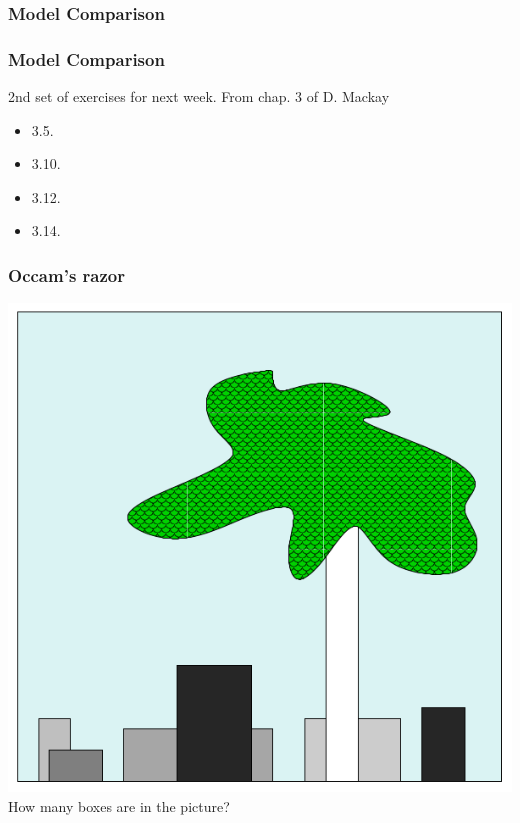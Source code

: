 \documentclass{beamer}
\begin{document}
\begin{frame}
	\frametitle{Model Comparison}
\end{frame}

\begin{frame}
	\frametitle{Model Comparison}
	2nd set of exercises for next week.
	From chap. 3 of D. Mackay
	\begin{itemize}
	\item 3.5.
	\item 3.10.
	\item 3.12.
	\item 3.14.
	\end{itemize}

\end{frame}



\begin{frame}
	\frametitle{Occam's razor}
   \includegraphics[width=.6\textwidth]{e19}\\
	How many boxes are in the picture?
\end{frame}
\end{document}
